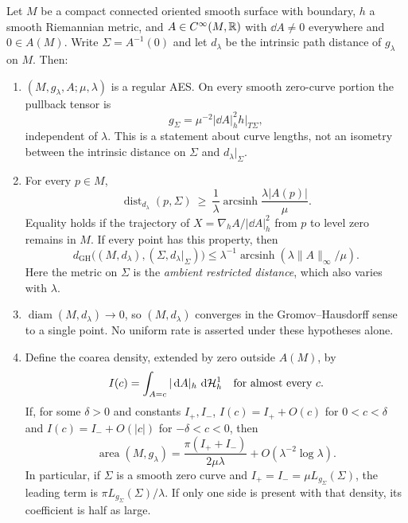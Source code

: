 \begin{proposition}
\label{prop:intensity-collapse}
Let $M$ be a compact connected oriented smooth surface with boundary, $h$ a
smooth Riemannian metric, and $A\in C^\infty(M,\mathbb{R})$ with $\dd A\ne0$
everywhere and $0\in A(M)$.  Write $\Sigma=A^{-1}(0)$ and let $d_\lambda$ be
the intrinsic path distance of $g_\lambda$ on $M$.  Then:
\begin{enumerate}
\item $(M,g_\lambda,A;\mu,\lambda)$ is a regular AES.  On every smooth
zero-curve portion the pullback tensor is
\[
 g_\Sigma=\mu^{-2}|\dd A|_h^2h|_{T\Sigma},
\]
independent of $\lambda$.  This is a statement about curve lengths, not an
isometry between the intrinsic distance on $\Sigma$ and $d_\lambda|_{\Sigma}$.
\item For every $p\in M$,
\begin{equation}
 \operatorname{dist}_{d_\lambda}(p,\Sigma)
 \ \ge\ \frac1\lambda\operatorname{arcsinh}
                  \frac{\lambda|A(p)|}{\mu}.
 \label{eq:intensity-collapse-distance}
\end{equation}
Equality holds if the trajectory of $X=\nabla_h A/|\dd A|_h^2$ from $p$ to
level zero remains in $M$.  If every point has this property, then
\[
 d_{\mathrm{GH}}\bigl((M,d_\lambda),(\Sigma,d_\lambda|_\Sigma)\bigr)
 \le \lambda^{-1}\operatorname{arcsinh}
                    (\lambda\|A\|_\infty/\mu).
\]
Here the metric on $\Sigma$ is the \emph{ambient restricted distance}, which
also varies with $\lambda$.
\item $\operatorname{diam}(M,d_\lambda)\to0$, so $(M,d_\lambda)$ converges
in the Gromov--Hausdorff sense to a single point.  No uniform rate is asserted
under these hypotheses alone.
\item Define the coarea density, extended by zero outside $A(M)$, by
\[
 I(c)=\int_{A=c}|\,\mathrm{d} A|_h\,\,\mathrm{d}\mathcal H_h^1
 \quad\hbox{for almost every }c.
\]
If, for some $\delta>0$ and constants $I_+,I_-$,
$I(c)=I_++O(c)$ for $0<c<\delta$ and
$I(c)=I_-+O(|c|)$ for $-\delta<c<0$, then
\begin{equation}
 \operatorname{area}(M,g_\lambda)
 =\frac{\pi(I_++I_-)}{2\mu\lambda}
       +O(\lambda^{-2}\log\lambda).
 \label{eq:intensity-area-sided}
\end{equation}
In particular, if $\Sigma$ is a smooth zero curve and
$I_+=I_-=\mu L_{g_\Sigma}(\Sigma)$, the leading term is
$\pi L_{g_\Sigma}(\Sigma)/\lambda$.  If only one side is present with that
density, its coefficient is half as large.
\end{enumerate}
\end{proposition}

